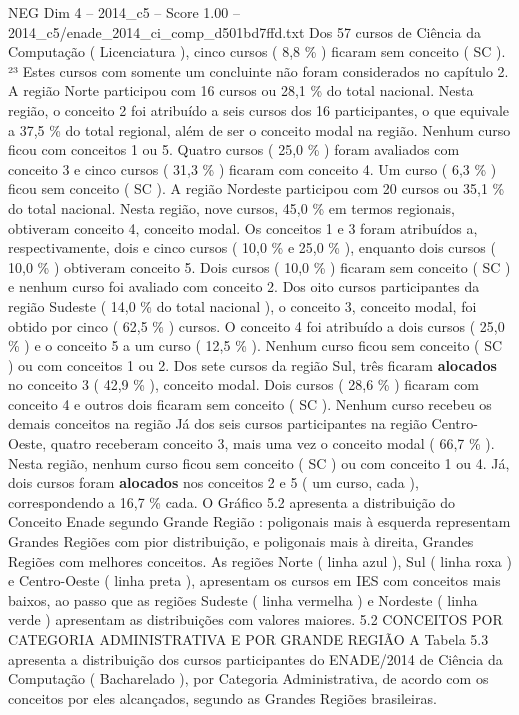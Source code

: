 \begin{textsample}{NEG Dim 4 – 2014\_c5 – Score 1.00 – 2014\_c5/enade\_2014\_ci\_comp\_d501bd7ffd.txt}
Dos 57 cursos de Ciência da Computação ( Licenciatura ), cinco cursos ( 8,8 \% ) ficaram sem conceito ( SC ). ²³ Estes cursos com somente um concluinte não foram considerados no capítulo 2.
A região Norte participou com 16 cursos ou 28,1 \% do total nacional.
Nesta região, o conceito 2 foi atribuído a seis cursos dos 16 participantes, o que equivale a 37,5 \% do total regional, além de ser o conceito modal na região.
Nenhum curso ficou com conceitos 1 ou 5.
Quatro cursos ( 25,0 \% ) foram avaliados com conceito 3 e cinco cursos ( 31,3 \% ) ficaram com conceito 4.
Um curso ( 6,3 \% ) ficou sem conceito ( SC ).
A região Nordeste participou com 20 cursos ou 35,1 \% do total nacional.
Nesta região, nove cursos, 45,0 \% em termos regionais, obtiveram conceito 4, conceito modal.
Os conceitos 1 e 3 foram atribuídos a, respectivamente, dois e cinco cursos ( 10,0 \% e 25,0 \% ), enquanto dois cursos ( 10,0 \% ) obtiveram conceito 5.
Dois cursos ( 10,0 \% ) ficaram sem conceito ( SC ) e nenhum curso foi avaliado com conceito 2.
Dos oito cursos participantes da região Sudeste ( 14,0 \% do total nacional ), o conceito 3, conceito modal, foi obtido por cinco ( 62,5 \% ) cursos.
O conceito 4 foi atribuído a dois cursos ( 25,0 \% ) e o conceito 5 a um curso ( 12,5 \% ).
Nenhum curso ficou sem conceito ( SC ) ou com conceitos 1 ou 2.
Dos sete cursos da região Sul, três ficaram \textbf{alocados} no conceito 3 ( 42,9 \% ), conceito modal.
Dois cursos ( 28,6 \% ) ficaram com conceito 4 e outros dois ficaram sem conceito ( SC ).
Nenhum curso recebeu os demais conceitos na região Já dos seis cursos participantes na região Centro-Oeste, quatro receberam conceito 3, mais uma vez o conceito modal ( 66,7 \% ).
Nesta região, nenhum curso ficou sem conceito ( SC ) ou com conceito 1 ou 4.
Já, dois cursos foram \textbf{alocados} nos conceitos 2 e 5 ( um curso, cada ), correspondendo a 16,7 \% cada.
O Gráfico 5.2 apresenta a distribuição do Conceito Enade segundo Grande Região : poligonais mais à esquerda representam Grandes Regiões com pior distribuição, e poligonais mais à direita, Grandes Regiões com melhores conceitos.
As regiões Norte ( linha azul ), Sul ( linha roxa ) e Centro-Oeste ( linha preta ), apresentam os cursos em IES com conceitos mais baixos, ao passo que as regiões Sudeste ( linha vermelha ) e Nordeste ( linha verde ) apresentam as distribuições com valores maiores. 5.2 CONCEITOS POR CATEGORIA ADMINISTRATIVA E POR GRANDE REGIÃO A Tabela 5.3 apresenta a distribuição dos cursos participantes do ENADE/2014 de Ciência da Computação ( Bacharelado ), por Categoria Administrativa, de acordo com os conceitos por eles alcançados, segundo as Grandes Regiões brasileiras.

\end{textsample}
